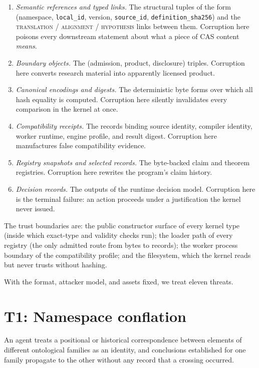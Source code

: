 \begin{enumerate}
\item \emph{Semantic references and typed links.} The structural tuples of the form (namespace, \texttt{local\_id}, version, \texttt{source\_id}, \texttt{definition\_sha256}) and the \textsc{translation} / \textsc{alignment} / \textsc{hypothesis} links between them. Corruption here poisons every downstream statement about what a piece of CAS content \emph{means}.
\item \emph{Boundary objects.} The (admission, product, disclosure) triples. Corruption here converts research material into apparently licensed product.
\item \emph{Canonical encodings and digests.} The deterministic byte forms over which all hash equality is computed. Corruption here silently invalidates every comparison in the kernel at once.
\item \emph{Compatibility receipts.} The records binding source identity, compiler identity, worker runtime, engine profile, and result digest. Corruption here manufactures false compatibility evidence.
\item \emph{Registry snapshots and selected records.} The byte-backed claim and theorem registries. Corruption here rewrites the program's claim history.
\item \emph{Decision records.} The outputs of the runtime decision model. Corruption here is the terminal failure: an action proceeds under a justification the kernel never issued.
\end{enumerate}

The trust boundaries are: the public constructor surface of every kernel type (inside which exact-type and validity checks run); the loader path of every registry (the only admitted route from bytes to records); the worker process boundary of the compatibility profile; and the filesystem, which the kernel reads but never trusts without hashing.

With the format, attacker model, and assets fixed, we treat eleven threats.

\section{T1: Namespace conflation}\label{threat:t1}

\begin{threat}\label{threat:thr:conflation}
An agent treats a positional or historical correspondence between elements of different ontological families as an identity, and conclusions established for one family propagate to the other without any record that a crossing occurred.
\end{threat}

